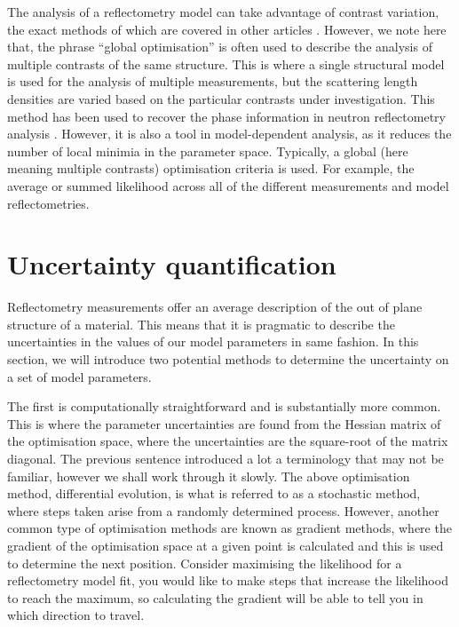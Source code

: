 \documentclass[
 reprint,
 superscriptaddress,
 amsmath,amssymb,
 aps,
]{revtex4-1}
\begin{document}
The analysis of a reflectometry model can take advantage of contrast variation, the exact methods of which are covered in other articles \cite{schurtenberger_contrast_2002}.
However, we note here that, the phrase ``global optimisation'' is often used to describe the analysis of multiple contrasts of the same structure.
This is where a single structural model is used for the analysis of multiple measurements, but the scattering length densities are varied based on the particular contrasts under investigation.
This method has been used to recover the phase information in neutron reflectometry analysis \cite{majkrzak_exact_1995,majkrzak_first_2000,majkrzak_phase_2003,koutsioubas_model_2019}.
However, it is also a tool in model-dependent analysis, as it reduces the number of local minimia in the parameter space.
Typically, a global (here meaning multiple contrasts) optimisation criteria is used. For example, the average or summed likelihood across all of the different measurements and model reflectometries.

\section{Uncertainty quantification}
Reflectometry measurements offer an average description of the out of plane structure of a material.
This means that it is pragmatic to describe the uncertainties in the values of our model parameters in same fashion.
In this section, we will introduce two potential methods to determine the uncertainty on a set of model parameters.

The first is computationally straightforward and is substantially more common.
This is where the parameter uncertainties are found from the Hessian matrix of the optimisation space, where the uncertainties are the square-root of the matrix diagonal.
The previous sentence introduced a lot a terminology that may not be familiar, however we shall work through it slowly.
The above optimisation method, differential evolution, is what is referred to as a stochastic method, where steps taken arise from a randomly determined process.
However, another common type of optimisation methods are known as gradient methods, where the gradient of the optimisation space at a given point is calculated and this is used to determine the next position.
Consider maximising the likelihood for a reflectometry model fit, you would like to make steps that increase the likelihood to reach the maximum, so calculating the gradient will be able to tell you in which direction to travel.
\end{document}
